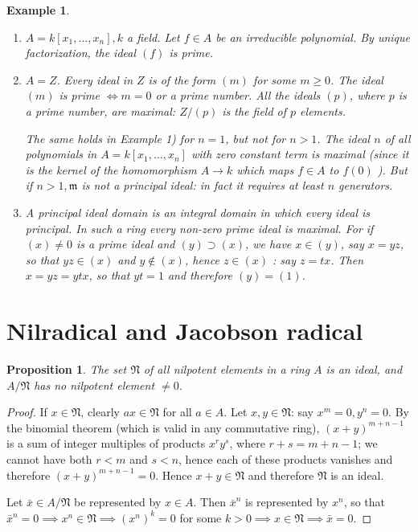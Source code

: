 \documentclass[class=book, crop=false]{standalone}
\newtheorem{proposition}[theorem]{Proposition}
\newtheorem*{example}{Example}
\theoremstyle{definition}
\theoremstyle{remark}
\begin{document}
\begin{example}
  \begin{enumerate}[1)]
    \item $A=k\left[x_{1}, \ldots, x_{n}\right], k$ a field. Let $f \in A$ be an
          irreducible polynomial. By unique factorization, the ideal $(f)$ is
          prime.
    \item $A=Z$. Every ideal in $Z$ is of the form $(m)$ for some $m \geq 0$.
          The ideal $(m)$ is prime $\iff m=0$ or a prime number. All
          the ideals $(p)$, where $p$ is a prime number, are maximal: $Z /(p)$
          is the field of $p$ elements.

          The same holds in Example 1) for $n=1$, but not for $n>1$. The ideal
          $n$ of all polynomials in $A=k\left[x_{1}, \ldots, x_{n}\right]$ with
          zero constant term is maximal (since it is the kernel of the
          homomorphism $A \to k$ which maps $f \in A$ to $f(0)$ ). But if
          $n>1, \mathfrak{m}$ is not a principal ideal: in fact it requires at
          least $n$ generators.
    \item A \textit{principal ideal domain} is an integral domain in which every
          ideal is principal. In such a ring every non-zero prime ideal is
          maximal. For if $(x) \neq 0$ is a prime ideal and $(y) \supset(x)$, we
          have $x \in(y)$, say $x=y z$, so that $y z \in(x)$ and $y \notin(x)$,
          hence $z \in(x)$ : say $z=t x$. Then $x=y z=y t x$, so that $y t=1$
          and therefore $(y)=(1)$.
  \end{enumerate}
\end{example}

\section{Nilradical and Jacobson radical}
\begin{proposition}\label{prop:1.7}
  The set $\mathfrak{N}$ of all nilpotent elements in a ring $A$ is an ideal, and
  $A / \mathfrak{N}$ has no nilpotent element $\neq 0$.
\end{proposition}
\begin{proof}
  If $x \in \mathfrak{N}$, clearly $a x \in \mathfrak{N}$ for all $a \in A$. Let $x, y \in \mathfrak{N}$:
  say $x^{m}=0, y^{n}=0$. By the binomial theorem (which is valid in any
  commutative ring), $(x+y)^{m+n-1}$ is a sum of integer multiples of products
  $x^{r} y^{s}$, where $r+s=m+n-1$; we cannot have both $r<m$ and $s<n$, hence
  each of these products vanishes and therefore $(x+y)^{m+n-1}=0$. Hence
  $x+y \in \mathfrak{N}$ and therefore $\mathfrak{N}$ is an ideal.

  Let $\bar{x} \in A / \mathfrak{N}$ be represented by $x \in A$. Then $\bar{x}^{n}$ is
  represented by $x^{n}$, so that
  $\bar{x}^{n}=0 \implies x^{n} \in \mathfrak{N} \implies\left(x^{n}\right)^{k}=0$ for
  some $k>0 \implies x \in \mathfrak{N} \implies \bar{x}=0$.
\end{proof}
\end{document}
